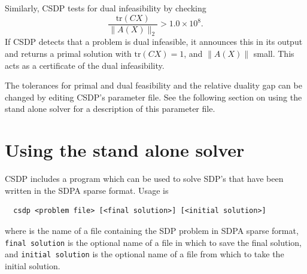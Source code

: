 \documentclass{article}
\begin{document}
Similarly, CSDP tests for dual infeasibility by checking
\begin{equation}
  \frac{\mbox{tr}(CX)}{\| A(X) \|_{2}} > 1.0 \times 10^8.
\end{equation}
If CSDP detects that a problem is dual 
infeasible, it announces this in its output and returns a primal 
solution with $\mbox{tr}(CX)=1$, and $\| A(X)\|$ small.  This acts
as a certificate of the dual infeasibility.  

The tolerances for primal and dual feasibility and the relative duality
gap can be changed by editing CSDP's parameter file.  See the 
following section on using the stand alone solver for a description of
this parameter file.

\section*{Using the stand alone solver}
CSDP includes a program which can be used to solve SDP's that have
been written in the SDPA sparse format.   Usage is  
\begin{verbatim}
  csdp <problem file> [<final solution>] [<initial solution>]
\end{verbatim}
where {\tt <problem file>} is the name of a file containing the SDP
problem in SDPA sparse format, {\tt final solution} is the optional
name of a file in which to save the final solution, and {\tt initial
solution} is the optional name of a file from which to take the
initial solution.
\end{document}
